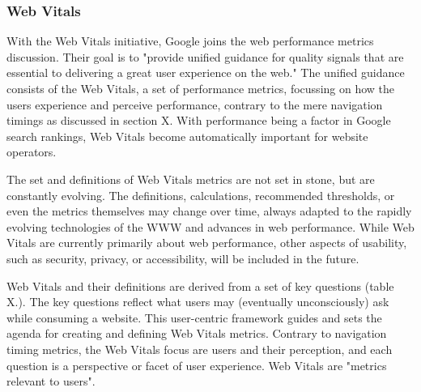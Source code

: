 






\subsubsection{Web Vitals}



With the Web Vitals initiative, Google joins the web performance metrics discussion.
Their goal is to "provide unified guidance for quality signals that are essential to delivering a great user experience on the web." %
The unified guidance consists of the Web Vitals, a set of performance metrics, focussing on how the users experience and perceive performance, contrary to the mere navigation timings as discussed in section X.
With performance being a factor in Google search rankings, Web Vitals become automatically important for website operators. %


The set and definitions of Web Vitals metrics are not set in stone, but are constantly evolving.
The definitions, calculations, recommended thresholds, or even the metrics themselves may change over time, always adapted to the rapidly evolving technologies of the WWW and advances in web performance. %
While Web Vitals are currently primarily about web performance, other aspects of usability, such as security, privacy, or accessibility, will be included in the future. %


Web Vitals and their definitions are derived from a set of key questions (table X.).
The key questions reflect what users may (eventually unconsciously) ask while consuming a website. 
This user-centric framework guides and sets the agenda for creating and defining Web Vitals metrics.
Contrary to navigation timing metrics, the Web Vitals focus are users and their perception, and each question is a perspective or facet of user experience.
Web Vitals are "metrics relevant to users". %


